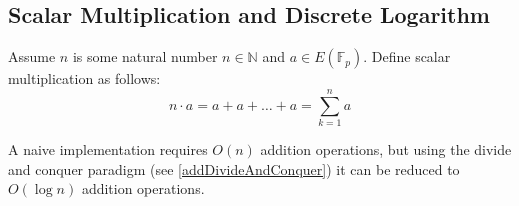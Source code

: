 \subsection{Scalar Multiplication and Discrete Logarithm}

Assume $n$ is some natural number $n \in \mathbb{N}$ and $a \in
E\left(\mathbb{F}_p\right)$. Define scalar multiplication as follows:
\[
n \cdot a = a + a + \dots + a = \sum_{k=1}^n a
\] 

A naive implementation requires $O\left(n\right)$ addition operations, but using the divide and conquer paradigm (see \autoref{addDivideAndConquer}) it can be reduced to $O\left(\log n\right)$ addition operations.



